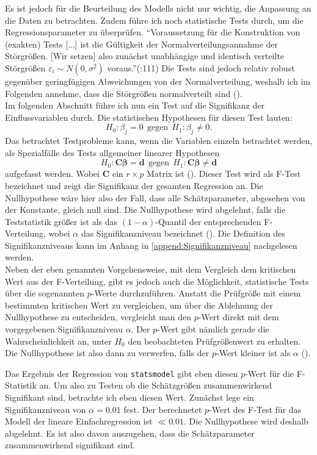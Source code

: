 Es ist jedoch für die Beurteilung des Modells nicht nur wichtig, die Anpassung an die Daten zu betrachten. Zudem führe ich noch statistische Tests durch, um die Regressionsparameter zu überprüfen. "`Voraussetzung für die Konstruktion von (exakten) Tests [...] ist die Gültigkeit der Normalverteilungsannahme der Störgrößen. [Wir setzen] also zunächst unabhängige und identisch verteilte Störgrößen $\varepsilon_i \sim N(0,\sigma^2)$ voraus."'(\cite{Fahrmeir.2009}:111) Die Tests sind jedoch relativ robust gegenüber geringfügigen Abweichungen von der Normalverteilung, weshalb ich im Folgenden annehme, dass die Störgrößen normalverteilt sind (\cite{Fahrmeir.2009}).\\
Im folgenden Abschnitt führe ich nun ein Test auf die Signifikanz der Einflussvariablen durch. Die statistischen Hypothesen für diesen Test lauten:
$$ H_0 : \beta_j = 0 \ \ \text{gegen} \ \ H_1: \beta_j \neq 0. $$
Das betrachtet Testprobleme kann, wenn die Variablen einzeln betrachtet werden, als Spezialfälle des Tests allgemeiner linearer Hypothesen
$$H_0: \boldsymbol{C}\boldsymbol{\beta} = \boldsymbol{d} \ \ \text{gegen} \ \ H_1: \boldsymbol{C}\boldsymbol{\beta} \neq \boldsymbol{d}$$
aufgefasst werden. Wobei $\boldsymbol{C}$ ein $r \times p$ Matrix ist (\cite{Fahrmeir.2009}). Dieser Test wird als F-Test bezeichnet und zeigt die Signifikanz der gesamten Regression an. Die Nullhypothese wäre hier also der Fall, dass alle Schätzparameter, abgesehen von der Konstante, gleich null sind. Die Nullhypothese wird abgelehnt, falls die Teststatistik größer ist als das $(1-\alpha)$-Quantil der entsprechenden F-Verteilung, wobei $\alpha$ das Signifikanzniveau bezeichnet (\cite{Fahrmeir.2009}). Die Definition des Signifikanzniveaus kann im Anhang in \ref{append:Signifikanzniveau} nachgelesen werden. \\
Neben der eben genannten Vorgehensweise, mit dem Vergleich dem kritischen Wert aus der F-Verteilung, gibt es jedoch auch die Möglichkeit, statistische Tests über die sogenannten $p$-Werte durchzuführen. Anstatt die Prüfgröße mit einem bestimmten kritischen Wert zu vergleichen, um über die Ablehnung der Nullhypothese zu entscheiden, vergleicht man den $p$-Wert direkt mit dem vorgegebenen Signifikanzniveau $\alpha$. Der $p$-Wert gibt nämlich gerade die Wahrscheinlichkeit an, unter $H_0$ den beobachteten Prüfgrößenwert zu erhalten. Die Nullhypothese ist also dann zu verwerfen, falls der $p$-Wert kleiner ist als $\alpha$ (\cite{Fahrmeir.2011}).

Das Ergebnis der Regression von \texttt{statsmodel} gibt eben diesen $p$-Wert für die F-Statistik an. Um also zu Testen ob die Schätzgrößen zusammenwirkend Signifikant sind, betrachte ich eben diesen Wert. Zunächst lege ein Signifikanzniveau von $\alpha = 0.01$ fest. Der berechnetet $p$-Wert des F-Test für das Modell der lineare Einfachregression ist $ \ll 0.01$. Die Nullhypothese wird deshalb abgelehnt. Es ist also davon auszugehen, dass die Schätzparameter zusammenwirkend signifikant sind.

